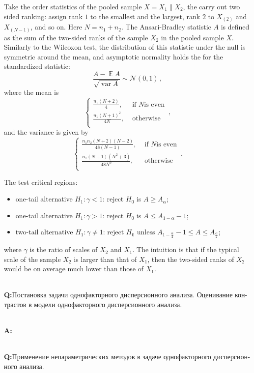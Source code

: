 \documentclass[a4paper,14pt]{extarticle}
\newcommand{\Ncal}{\mathcal{N}}
\newcommand{\ex}{\mathop{\mathbb{E}}\nolimits}
\newcommand{\var}{\mathop{\text{var}}}
\newcommand{\rus}[1]{\foreignlanguage{russian}{#1}}
\begin{document}
Take the order statistics of the pooled sample $X = X_1 \| X_2$, the carry out two
sided ranking: assign rank $1$ to the smallest and the largest, rank $2$ to $X_{(2)}$
and $X_{(N-1)}$, and so on. Here $N=n_1+n_2$. The Ansari-Bradley statistic $A$ is
defined as the sum of the two-sided ranks of the sample $X_2$ in the pooled sample
$X$. Similarly to the Wilcoxon test, the distribution of this statistic under the
null is symmetric around the mean, and asymptotic normality holds the for the standardized
statistic:
$$ \frac{A - \ex A}{\sqrt{\var A}} \sim \Ncal(0, 1) \,, $$
where the mean is
$$ \begin{cases}
    \frac{n_1(N+2)}{4}, &\text{ if } N \text{is even}\\
    \frac{n_1(N+1)^2}{4 N}, &\text{ otherwise}\\
\end{cases} \,, $$
and the variance is given by
$$ \begin{cases}
    \frac{n_1 n_2(N+2)(N-2)}{48(N-1)}, &\text{ if } N \text{is even}\\
    \frac{n_1(N+1)(N^2+3)}{48 N^2}, &\text{ otherwise}\\
\end{cases} \,. $$

The test critical regions: \begin{itemize}
    \item one-tail alternative $H_1:\gamma < 1$: reject $H_0$ is $A\geq A_\alpha$;
    \item one-tail alternative $H_1:\gamma > 1$: reject $H_0$ is $A\leq A_{1-\alpha} - 1$;
    \item two-tail alternative $H_1:\gamma \neq 1$: reject $H_0$ unless
    $A_{1-\frac{\alpha}{2}} - 1 \leq A \leq A_\frac{\alpha}{2}$;
\end{itemize}
where $\gamma$ is the ratio of scales of $X_2$ and $X_1$.
The intuition is that if the typical scale of the sample $X_2$ is larger than that
of $X_1$, then the two-sided ranks of $X_2$ would be on average much lower than
those of $X_1$.


\hfill\\\noindent\textbf{Q:}\rus{Постановка задачи однофакторного дисперсионного
анализа. Оценивание контрастов в модели однофакторного дисперсионного анализа.}

\hfill\\\noindent\textbf{A:}

\hfill\\\noindent\textbf{Q:}\rus{Применение непараметрических методов в задаче однофакторного
дисперсионного анализа.}
\end{document}

